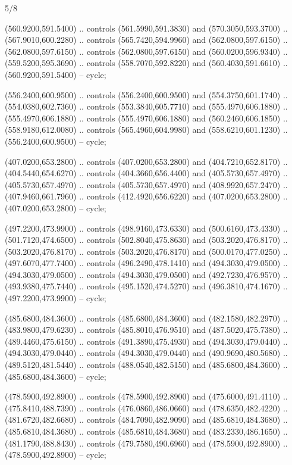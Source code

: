 \begin{flagdescription}{5/8}
\begin{scope}[shift={(m)}]
\begin{scope}[scale=\flagwidth/220,y=0.1mm, x=0.1mm, yscale=-1,shift={(-596,-360)}]
\begin{scope}[draw=black,line join=round,line cap=round,line width=0.381\lw]
\begin{scope}[fill=gold]
 (560.9200,591.5400) .. controls (561.5990,591.3830) and
  (570.3050,593.3700) .. (567.9010,600.2280) .. controls (565.7420,594.9960) and
  (562.0800,597.6150) .. (562.0800,597.6150) .. controls (562.0800,597.6150) and
  (560.0200,596.9340) .. (559.5200,595.3690) .. controls (558.7070,592.8220) and
  (560.4030,591.6610) .. (560.9200,591.5400) -- cycle;

 (556.2400,600.9500) .. controls (556.2400,600.9500) and
  (554.3750,601.1740) .. (554.0380,602.7360) .. controls (553.3840,605.7710) and
  (555.4970,606.1880) .. (555.4970,606.1880) .. controls (555.4970,606.1880) and
  (560.2460,606.1850) .. (558.9180,612.0080) .. controls (565.4960,604.9980) and
  (558.6210,601.1230) .. (556.2400,600.9500) -- cycle;

 (407.0200,653.2800) .. controls (407.0200,653.2800) and
  (404.7210,652.8170) .. (404.5440,654.6270) .. controls (404.3660,656.4400) and
  (405.5730,657.4970) .. (405.5730,657.4970) .. controls (405.5730,657.4970) and
  (408.9920,657.2470) .. (407.9460,661.7960) .. controls (412.4920,656.6220) and
  (407.0200,653.2800) .. (407.0200,653.2800) -- cycle;

\end{scope}
\begin{scope}[fill=olive]
 (497.2200,473.9900) .. controls (498.9160,473.6330) and
  (500.6160,473.4330) .. (501.7120,474.6500) .. controls (502.8040,475.8630) and
  (503.2020,476.8170) .. (503.2020,476.8170) .. controls (503.2020,476.8170) and
  (500.0170,477.0250) .. (497.6070,477.7400) .. controls (496.2490,478.1410) and
  (494.3030,479.0500) .. (494.3030,479.0500) .. controls (494.3030,479.0500) and
  (492.7230,476.9570) .. (493.9380,475.7440) .. controls (495.1520,474.5270) and
  (496.3810,474.1670) .. (497.2200,473.9900) -- cycle;

 (485.6800,484.3600) .. controls (485.6800,484.3600) and
  (482.1580,482.2970) .. (483.9800,479.6230) .. controls (485.8010,476.9510) and
  (487.5020,475.7380) .. (489.4460,475.6150) .. controls (491.3890,475.4930) and
  (494.3030,479.0440) .. (494.3030,479.0440) .. controls (494.3030,479.0440) and
  (490.9690,480.5680) .. (489.5120,481.5440) .. controls (488.0540,482.5150) and
  (485.6800,484.3600) .. (485.6800,484.3600) -- cycle;

 (478.5900,492.8900) .. controls (478.5900,492.8900) and
  (475.6000,491.4110) .. (475.8410,488.7390) .. controls (476.0860,486.0660) and
  (478.6350,482.4220) .. (481.6720,482.6680) .. controls (484.7090,482.9090) and
  (485.6810,484.3680) .. (485.6810,484.3680) .. controls (485.6810,484.3680) and
  (483.2330,486.1650) .. (481.1790,488.8430) .. controls (479.7580,490.6960) and
  (478.5900,492.8900) .. (478.5900,492.8900) -- cycle;


\end{scope}
\end{scope}
\end{scope}
\end{scope}
\end{flagdescription}
